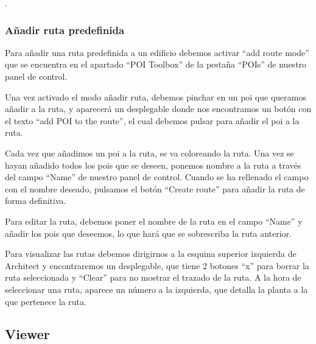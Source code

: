 .

\subsubsection{Añadir ruta predefinida}

Para añadir una ruta predefinida a un edificio debemos activar ``add route mode'' que se encuentra en el apartado ``POI Toolbox'' de la pestaña ``POIs'' de nuestro panel de control.



Una vez activado el modo añadir ruta, debemos pinchar en un poi que queramos añadir a la ruta, y aparecerá un desplegable donde nos encontramos un botón con el texto ``add POI to the route'', el cual debemos pulsar para añadir el poi a la ruta.


Cada vez que añadimos un poi a la ruta, se va coloreando la ruta. Una vez se hayan añadido todos los pois que se deseen, ponemos nombre a la ruta a través del campo ``Name'' de nuestro panel de control. Cuando se ha rellenado el campo con el nombre deseado, pulsamos el botón ``Create route'' para añadir la ruta de forma definitiva.  


Para editar la ruta, debemos poner el nombre de la ruta en el campo ``Name'' y añadir los pois que deseemos, lo que hará que se sobrescriba la ruta anterior.

Para visualizar las rutas debemos dirigirnos a la esquina superior izquierda de Architect y encontraremos un desplegable, que tiene 2 botones ``x'' para borrar la ruta seleccionada y ``Clear'' para no mostrar el trazado de la ruta. A la hora de seleccionar una ruta, aparece un número a la izquierda, que detalla la planta a la que pertenece la ruta. 





\subsection{Viewer}

